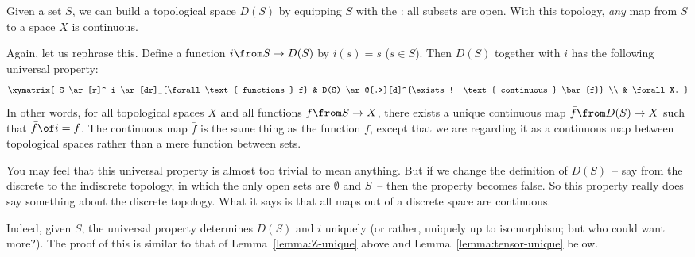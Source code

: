 \begin{iexample} 
\label{eg:univ-discrete}
Given a set $S$, we can build a topological space $D(S)$%
%
%
by equipping $S$ with the : all subsets are open.  With this topology, \emph{any} map from
$S$ to a space $X$ is continuous.

Again, let us rephrase this.  Define a function $i\from S \to D(S)$ by
$i(s) = s$ ($s \in S$).  Then $D(S)$ together with $i$ has the following
universal property:
\[
\xymatrix{
S \ar[r]^-i \ar[dr]_{\forall \text{ functions } f}       &
D(S) \ar@{.>}[d]^{\exists! \text{ continuous } \bar{f}}   \\
&
\forall X.
}
\]
In other words, for all topological spaces $X$ and all functions $f\from S \to
X$, there exists a unique continuous map $\bar{f}\from D(S) \to X$ such that
$\bar{f} \of i = f$.  The continuous map $\bar{f}$ is the same thing as the
function $f$, except that we are regarding it as a continuous map between
topological spaces rather than a mere function between sets.

You may feel that this universal property is almost too trivial to mean
anything.  But if we change the definition of $D(S)$~-- say from the
discrete to the indiscrete topology, in which the only open sets are
$\emptyset$ and $S$~-- then the property becomes false.  So this property
really does say something about the discrete topology.  What it says is
that all maps out of a discrete space are continuous.

Indeed, given $S$, the universal property determines $D(S)$ and $i$
uniquely (or rather, uniquely up to isomorphism; but who could want more?).
The proof of this is similar to that of Lemma~\ref{lemma:Z-unique} above
and Lemma~\ref{lemma:tensor-unique} below.
\end{iexample}

